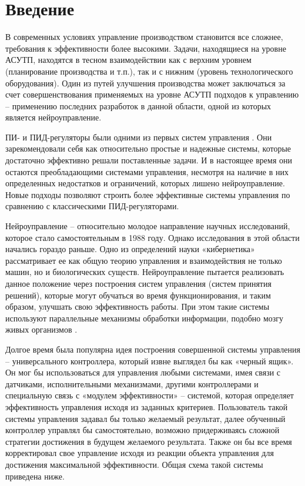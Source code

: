 \chapter*{Введение}

В современных условиях управление производством становится все сложнее, требования к эффективности более высокими. Задачи, находящиеся на уровне АСУТП, находятся в тесном взаимодействии как с верхним уровнем (планирование производства и т.п.), так и с нижним (уровень технологического оборудования). Один из путей улучшения производства может заключаться за счет совершенствования применяемых на уровне АСУТП подходов к управлению – применению последних разработок в данной области, одной из которых является нейроуправление.

ПИ- и ПИД-регуляторы были одними из первых систем управления \cite{Omatu_Khalid_Yusof}. Они зарекомендовали себя как относительно простые и надежные системы, которые достаточно эффективно решали поставленные задачи. И в настоящее время они остаются преобладающими системами управления, несмотря на наличие в них определенных недостатков и ограничений, которых лишено нейроуправление. Новые подходы позволяют строить более эффективные системы управления по сравнению с классическими ПИД-регуляторами.

Нейроуправление – относительно молодое направление научных исследований, которое стало самостоятельным в 1988 году. Однако исследования в этой области начались гораздо раньше. Одно из определений науки «кибернетика» рассматривает ее как общую теорию управления и взаимодействия не только машин, но и биологических существ. Нейроуправление пытается реализовать данное положение через построения систем управления (систем принятия решений), которые могут обучаться во время функционирования, и таким образом, улучшать свою эффективность работы. При этом такие системы используют параллельные механизмы обработки информации, подобно мозгу живых организмов \cite{Uskov_2004}.

Долгое время была популярна идея построения совершенной системы управления – универсального контроллера, который извне выглядел бы как «черный ящик». Он мог бы использоваться для управления любыми системами, имея связи с датчиками, исполнительными механизмами, другими контроллерами и специальную связь с «модулем эффективности» – системой, которая определяет эффективность управления исходя из заданных критериев. Пользователь такой системы управления задавал бы только желаемый результат, далее обученный контроллер управлял бы самостоятельно, возможно придерживаясь сложной стратегии достижения в будущем желаемого результата. Также он бы все время корректировал свое управление исходя из реакции объекта управления для достижения максимальной эффективности. Общая схема такой системы приведена ниже.

